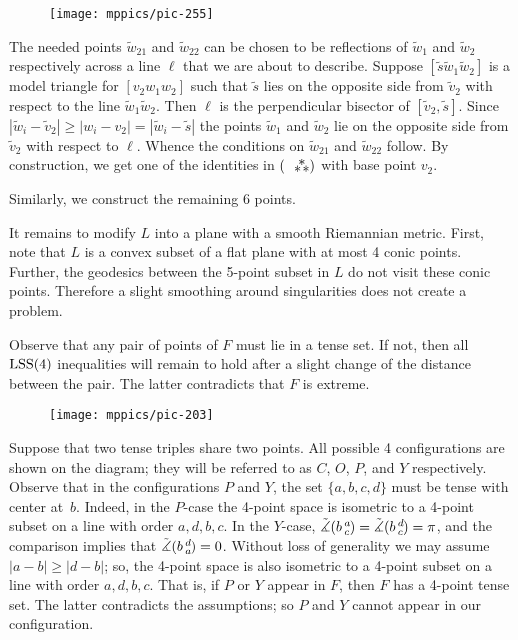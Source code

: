 \documentclass{article}
\begin{document}
\begin{wrapfigure}{r}{33mm}
\vskip-8mm
\centering
\texttt{[image: mppics/pic-255]}
\end{wrapfigure}

The needed points $\tilde w_{21}$ and $\tilde w_{22}$ can be chosen to be reflections of $\tilde w_{1}$ and $\tilde w_{2}$ respectively across a line $\ell$ that we are about to describe.
Suppose $[\tilde s\tilde w_1 \tilde w_2]$ is a model triangle for $[v_2w_1w_2]$ such that $\tilde s$ lies on the opposite side from $\tilde v_2$ with respect to the line $\tilde w_1\tilde w_2$.
Then $\ell$ is the perpendicular bisector of $[\tilde v_2, \tilde s]$.
Since $|\tilde w_i-\tilde v_2|\ge | w_i- v_2|=|\tilde w_i-\tilde s|$ the points $\tilde w_1$ and $\tilde w_2$ lie on the opposite side from $\tilde v_2$ with respect to $\ell$.
Whence the conditions on $\tilde w_{21}$ and $\tilde w_{22}$ follow.
By construction, we get one of the identities in $(\asterism)$ with base point $v_2$.

Similarly, we construct the remaining 6 points.

It remains to modify $L$ into a plane with a smooth Riemannian metric.
First, note that $L$ is a convex subset of a flat plane with at most 4 conic points.
Further, the geodesics between the 5-point subset in $L$ do not visit these conic points.
Therefore a slight smoothing around singularities does not create a problem.
\qeds


Observe that any pair of points of $F$ must lie in a tense set.
If not, then all $\mathrm{LSS}(4)$ inequalities will remain to hold after a slight change of the distance between the pair.
The latter contradicts that $F$ is extreme.

\begin{wrapfigure}[5]{l}{60mm}
\vskip-2mm
\centering
\texttt{[image: mppics/pic-203]}
\label{page:COPY}
\end{wrapfigure}

Suppose that two tense triples share two points.
All possible 4 configurations are shown on the diagram; they will be referred to as $C$, $O$, $P$, and $Y$ respectively.
Observe that in the configurations $P$ and $Y$, the set $\{a,b,c,d\}$ must be tense with center at~$b$.
Indeed, in the $P$-case the 4-point space is isometric to a 4-point subset on a line with order $a,d,b,c$.
In the $Y$-case, $\tilde\measuredangle(b\,{}^{a}_{c}\hspace{-0.2ex})=\tilde\measuredangle(b\,{}^{d}_{c}\hspace{-0.2ex})=\pi$, and the comparison implies that $\tilde\measuredangle(b\,{}^{d}_{a}\hspace{-0.2ex})=0$.
Without loss of generality we may assume $|a-b|\ge |d-b|$;
so, the 4-point space is also isometric to a 4-point subset on a line with order $a,d,b,c$.
That is, if $P$ or $Y$ appear in $F$, then $F$ has a 4-point tense set.
The latter contradicts the assumptions; so $P$ and $Y$ cannot appear in our configuration.
\end{document}
